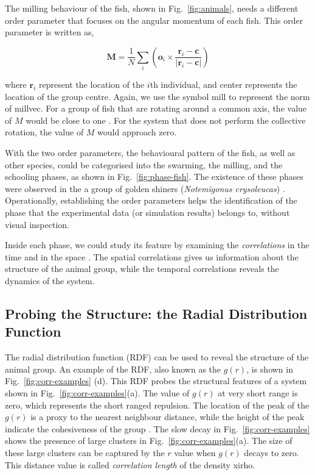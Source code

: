 \documentclass[11pt,twoside]{report}
\begin{document}
The milling behaviour of the fish, shown in Fig.~\ref{fig:animals}, needs a different order parameter that focuses on the angular momentum of each fish. This order parameter is written as,

\begin{equation*}
	\mathbf{M} = \frac1N \sum_i \left(
		\mathbf{o}_i \times \frac{
			\mathbf{r}_i - \mathbf{c}
		}{\vert \mathbf{r}_i - \mathbf{c} \vert}
	\right)
\end{equation*}

\noindent where $\mathbf{r}_i$ represent the location of the $i$th individual, and \gls{center} represents the location of the group centre. Again, we use the symbol \gls{mill} to represent the norm of \gls{millvec}. For a group of fish that are rotating around a common axis, the value of $M$ would be close to one \cite{couzin2002, calovi2014}. For the system that does not perform the collective rotation, the value of $M$ would approach zero.

With the two order parameters, the behavioural pattern of the fish, as well as other species, could be categorised into the swarming, the milling, and the schooling phases, as shown in Fig.~\ref{fig:phase-fish}. The existence of these phases were observed in the a group of golden shiners (\emph{Notemigonus crysoleucas}) \cite{tunstrom2013}.
Operationally, establishing the order parameters helps the identification of the phase that the experimental data (or simulation results) belongs to, without visual inspection.

Inside each phase, we could study its feature by examining the \emph{correlations} in the time and in the space \cite{grigera2020}. The spatial correlations gives us information about the structure of the animal group, while the temporal correlations reveals the dynamics of the system.


\subsection{Probing the Structure: the Radial Distribution Function}
\label{section:intro-corr-rdf}

The radial distribution function (\gls{RDF}) can be used to reveal the structure of the animal group. An example of the RDF, also known as the $g(r)$, is shown in Fig.~\ref{fig:corr-examples} (d). This RDF probes the structural features of a system shown in Fig.~\ref{fig:corr-examples}(a). The value of $g(r)$ at very short range is zero, which represents the short ranged repulsion. The location of the peak of the $g(r)$ is a proxy to the nearest neighbour distance, while the height of the peak indicate the cohesiveness of the group \cite{hansen2013}. The slow decay in Fig.~\ref{fig:corr-examples} shows the presence of large clusters in Fig.~\ref{fig:corr-examples}(a).
The size of these large clusters can be captured by the $r$ value when $g(r)$ decays to zero. This distance value is called \emph{correlation length} of the density \gls{xirho}. 
\end{document}
